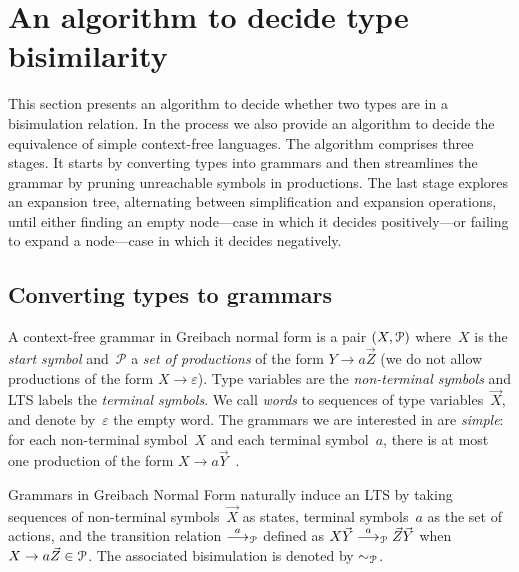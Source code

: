 \section{An algorithm to decide type bisimilarity}
\label{sec:algorithm}



This section presents an algorithm to decide whether two types are in
a bisimulation relation. In the process we also provide an algorithm
to decide the equivalence of simple context-free languages.
%
The algorithm comprises three stages. It
starts by converting types into grammars and then streamlines the
grammar by pruning unreachable symbols in productions. The last stage
explores an expansion tree, alternating between simplification and
expansion operations, until either finding an empty node---case in
which it decides positively---or failing to expand a node---case in
which it decides negatively.

\subsection{Converting types to grammars}
\label{subsec:typeToGrammar}

A context-free grammar in Greibach normal form is a pair
$(X,\mathcal P)$ where~$X$ is the \emph{start symbol}
and~$\mathcal P$ a \emph{set of productions} of the form
$Y \rightarrow a\vec Z$ (we do not allow productions of the form
$X \rightarrow\varepsilon$). Type variables are the \emph{non-terminal
  symbols} and LTS labels the \emph{terminal symbols}. We call
\emph{words} to sequences of type variables~$\vec X$, and denote
by~$\varepsilon$ the empty word.
%
The grammars we are interested in are \emph{simple}: for each
non-terminal symbol~$X$ and each terminal symbol~$a$, there is at most
one production of the form
$X \rightarrow a\vec Y$~\cite{simpleGrammar}. 

Grammars in Greibach Normal Form naturally induce an LTS by taking
sequences of non-terminal symbols~$\vec X$ as states, terminal
symbols~$a$ as the set of actions, and the transition relation
$\stackrel{a}{\longrightarrow}_\mathcal P$ defined as $X\vec Y\stackrel{a}{\longrightarrow}_\mathcal P \vec Z\vec Y$ when
$X \rightarrow a\vec Z \in\mathcal P$.
The associated bisimulation is denoted by $\sim_\mathcal P$.

